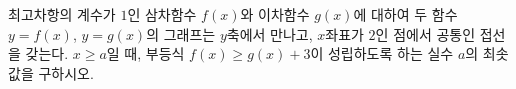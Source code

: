 최고차항의 계수가 $1$인 삼차함수 $f(x)$와 이차함수 $g(x)$에 대하여 두 함수 $y=f(x)$, $y=g(x)$의 그래프는 $y$축에서 만나고, $x$좌표가 $2$인 점에서 공통인 접선을 갖는다. $x\ge a$일 때, 부등식 $f(x)\ge g(x)+3$이 성립하도록 하는 실수 $a$의 최솟값을 구하시오.
